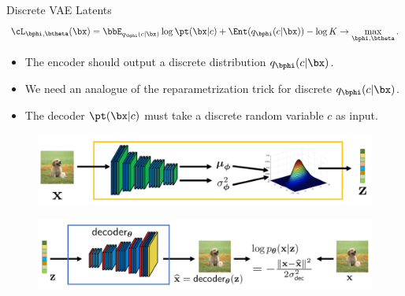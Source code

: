 \documentclass{beamer}
\begin{document}
\begin{frame}{Discrete VAE Latents}
	\[
		\cL_{\bphi, \btheta}(\bx)  = \bbE_{q_{\bphi}(c| \bx)} \log \pt(\bx| c) + \Ent(q_{\bphi}(c| \bx)) - \log K \rightarrow \max_{\bphi, \btheta}.
	\]
	\eqpause
	\vspace{-0.5cm}
	\begin{itemize}
		\item The encoder should output a discrete distribution $q_{\bphi}(c| \bx)$.
					\item We need an analogue of the reparametrization trick for discrete $q_{\bphi}(c| \bx)$.
		\item The decoder $\pt(\bx| c)$ must take a discrete random variable $c$ as input.
	\end{itemize}
	\begin{figure}[h]
		\centering
		\includegraphics[width=0.7\linewidth]{figs/vae-encoder}
	\end{figure}
	\begin{figure}[h]
		\centering
		\includegraphics[width=0.9\linewidth]{figs/vae-decoder}
	\end{figure}
\end{frame}
\end{document}
